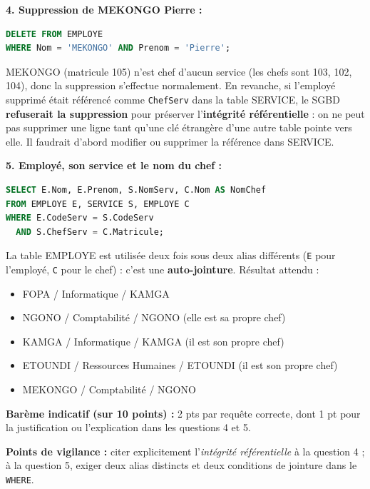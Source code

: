 \documentclass[11pt]{article}
\begin{document}
\begin{corrige}
\textbf{4. Suppression de MEKONGO Pierre :}
\begin{lstlisting}[language=SQL]
DELETE FROM EMPLOYE
WHERE Nom = 'MEKONGO' AND Prenom = 'Pierre';
\end{lstlisting}
MEKONGO (matricule 105) n'est chef d'aucun service (les chefs sont 103, 102, 104), donc la suppression s'effectue normalement. En revanche, si l'employé supprimé était référencé comme \texttt{ChefServ} dans la table SERVICE, le SGBD \textbf{refuserait la suppression} pour préserver l'\textbf{intégrité référentielle} : on ne peut pas supprimer une ligne tant qu'une clé étrangère d'une autre table pointe vers elle. Il faudrait d'abord modifier ou supprimer la référence dans SERVICE.

\textbf{5. Employé, son service et le nom du chef :}
\begin{lstlisting}[language=SQL]
SELECT E.Nom, E.Prenom, S.NomServ, C.Nom AS NomChef
FROM EMPLOYE E, SERVICE S, EMPLOYE C
WHERE E.CodeServ = S.CodeServ
  AND S.ChefServ = C.Matricule;
\end{lstlisting}
La table EMPLOYE est utilisée deux fois sous deux alias différents (\texttt{E} pour l'employé, \texttt{C} pour le chef) : c'est une \textbf{auto-jointure}.
Résultat attendu :
\begin{itemize}
    \item FOPA / Informatique / KAMGA
    \item NGONO / Comptabilité / NGONO (elle est sa propre chef)
    \item KAMGA / Informatique / KAMGA (il est son propre chef)
    \item ETOUNDI / Ressources Humaines / ETOUNDI (il est son propre chef)
    \item MEKONGO / Comptabilité / NGONO
\end{itemize}

\textbf{Barème indicatif (sur 10 points) :} 2 pts par requête correcte, dont 1 pt pour la justification ou l'explication dans les questions 4 et 5.

\textbf{Points de vigilance :} citer explicitement l'\emph{intégrité référentielle} à la question 4 ; à la question 5, exiger deux alias distincts et deux conditions de jointure dans le \texttt{WHERE}.
\end{corrige}
\end{document}
